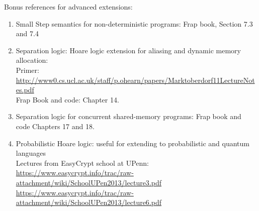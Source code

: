 \documentclass{article}
\begin{document}
Bonus references for advanced extensions: \begin{enumerate}
    \item Small Step semantics for non-deterministic programs: Frap book, Section 7.3 and 7.4
    \item Separation logic: Hoare logic extension for aliasing and dynamic memory allocation: \\
    Primer: \href{http://www0.cs.ucl.ac.uk/staff/p.ohearn/papers/Marktoberdorf11LectureNotes.pdf}{http://www0.cs.ucl.ac.uk/staff/p.ohearn/papers/Marktoberdorf11LectureNotes.pdf} \\
    Frap Book and code: Chapter 14.
    \item Separation logic for concurrent shared-memory programs: Frap book and code Chapters 17 and 18.
    \item Probabilistic Hoare logic: useful for extending to probabilistic and quantum languages\\ 
    Lectures from EasyCrypt school at UPenn: \\
    \href{https://www.easycrypt.info/trac/raw-attachment/wiki/SchoolUPen2013/lecture3.pdf}{https://www.easycrypt.info/trac/raw-attachment/wiki/SchoolUPen2013/lecture3.pdf} \\
    \href{https://www.easycrypt.info/trac/raw-attachment/wiki/SchoolUPen2013/lecture6.pdf}{https://www.easycrypt.info/trac/raw-attachment/wiki/SchoolUPen2013/lecture6.pdf}
\end{enumerate}
\end{document}
